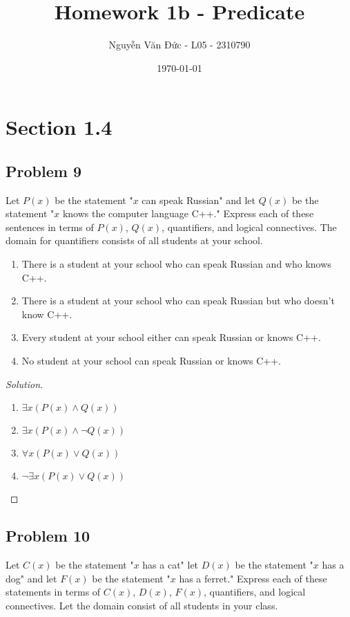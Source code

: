 \documentclass{article}
\title{Homework 1b - Predicate}
\author{Nguyễn Văn Đức - L05 - 2310790}
\date\today
\newcommand*\makealpha[1]{\symbol{\numexpr96+#1}}
\newenvironment{solution}{\renewcommand\qedsymbol{}\begin{proof}[Solution]}{\end{proof}}
\begin{document}
\maketitle
\renewcommand{\labelenumi}{\textbf{\makealpha{\arabic{enumi}})}}

\def\colspace{88pt}
\setlength{\tabcolsep}{0pt}

\section*{Section 1.4}
\subsection*{Problem 9}
Let $P(x)$ be the statement "$x$ can speak Russian" and let $Q(x)$ be the statement "$x$ knows the computer language C++." Express each of these sentences in terms of $P(x)$, $Q(x)$, quantifiers, and logical connectives. The domain for quantifiers consists of all students at your school.

\begin{enumerate}[leftmargin=16pt, topsep = 8pt]
\item There is a student at your school who can speak Russian and who knows C++.
\item There is a student at your school who can speak Russian but who doesn't know C++.
\item Every student at your school either can speak Russian or knows C++.
\item No student at your school can speak Russian or knows C++.
\end{enumerate}

\begin{solution}
\hspace{1pt}

\begin{enumerate}
\item $\exists x(P(x) \land Q(x))$
\item $\exists x(P(x) \land \neg Q(x))$
\item $\forall x(P(x) \lor Q(x))$
\item $\neg \exists x(P(x) \lor Q(x))$
\end{enumerate}
\end{solution}

\clearpage
\subsection*{Problem 10}
Let $C(x)$ be the statement "$x$ has a cat" let $D(x)$ be the statement "$x$ has a dog" and let $F(x)$ be the statement "$x$ has a ferret." Express each of these statements in terms of $C(x)$, $D(x)$, $F(x)$, quantifiers, and logical connectives. Let the domain consist of all students in your class.
\end{document}
